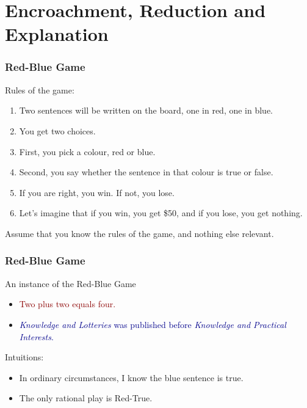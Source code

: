 
\def\latexmode{beamer}
\def\mytitle{Interests and Evidence}
\def\myauthor{Brian Weatherson}
\def\mydate{February 26, 2017}


\section{Encroachment, Reduction and Explanation}
\label{encroachmentreductionandexplanation}

\begin{frame}

\frametitle{Red-Blue Game}
\label{red-bluegame}

Rules of the game:

\begin{enumerate}
\item Two sentences will be written on the board, one in red, one in blue.

\item You get two choices.

\item First, you pick a colour, red or blue.

\item Second, you say whether the sentence in that colour is true or false.

\item If you are right, you win. If not, you lose.

\item Let's imagine that if you win, you get \$50, and if you lose, you get nothing.

\end{enumerate}

Assume that you know the rules of the game, and nothing else relevant.

\end{frame}

\begin{frame}

\frametitle{Red-Blue Game}
\label{red-bluegame}

An instance of the Red-Blue Game 

\begin{itemize}
\item \textcolor{darkred}{Two plus two equals four.}

\item \textcolor{darkblue}{\textit{Knowledge and Lotteries} was published before \textit{Knowledge and Practical Interests}.}

\end{itemize}

Intuitions:

\begin{itemize}
\item In ordinary circumstances, I know the blue sentence is true.

\item The only rational play is Red-True.

\end{itemize}

\end{frame}

